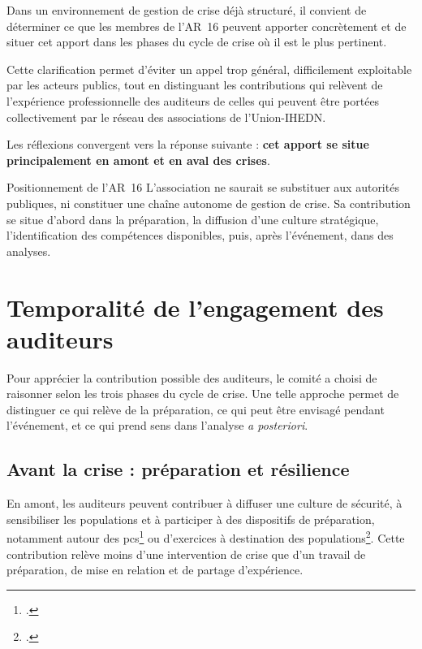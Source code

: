 \documentclass[12pt,a4paper]{article}
\newcommand{\UnionIHEDN}{Union-IHEDN}
\newcommand{\AssociationsUnionIHEDN}{associations de l'\UnionIHEDN}
\newcommand{\ARSeize}{AR~16}
\begin{document}

Dans un environnement de gestion de crise déjà structuré, il convient de déterminer ce que les membres de l'\ARSeize{} peuvent apporter concrètement et de situer cet apport dans les phases du cycle de crise où il est le plus pertinent.

Cette clarification permet d'éviter un appel trop général, difficilement exploitable par les acteurs publics, tout en distinguant les contributions qui relèvent de l'expérience professionnelle des auditeurs de celles qui peuvent être portées collectivement par le réseau des \AssociationsUnionIHEDN.

Les réflexions convergent vers la réponse suivante : \textbf{cet apport se situe principalement en amont et en aval des crises}.

\begin{proposition}{Positionnement de l'\ARSeize}
L'association ne saurait se substituer aux autorités publiques, ni constituer une chaîne autonome de gestion de crise. Sa contribution se situe d'abord dans la préparation, la diffusion d'une culture stratégique, l'identification des compétences disponibles, puis, après l'événement, dans des analyses.
\end{proposition}

\clearpage

\section{Temporalité de l'engagement des auditeurs}

Pour apprécier la contribution possible des auditeurs, le comité a choisi de raisonner selon les trois phases du cycle de crise. Une telle approche permet de distinguer ce qui relève de la préparation, ce qui peut être envisagé pendant l'événement, et ce qui prend sens dans l'analyse \textit{a posteriori}.

\subsection{Avant la crise : préparation et résilience}

En amont, les auditeurs peuvent contribuer à diffuser une culture de sécurité, à sensibiliser les populations et à participer à des dispositifs de préparation, notamment autour des \gls{pcs}\footcite{PCS_PICS_def} ou d'exercices à destination des populations\footcite{Gestion_de_crise_def_exemples}. Cette contribution relève moins d'une intervention de crise que d'un travail de préparation, de mise en relation et de partage d'expérience.
\end{document}
